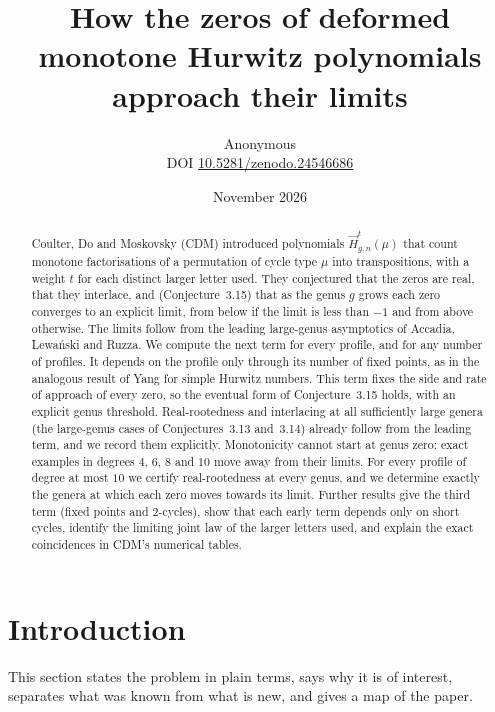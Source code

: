 \documentclass[11pt,a4paper]{article}
\title{How the zeros of deformed monotone Hurwitz polynomials approach their limits}
\author{Anonymous\\[3pt]{\small DOI \href{https://doi.org/10.5281/zenodo.24546686}{10.5281/zenodo.24546686}}}
\date{November 2026}
\theoremstyle{definition}\newtheorem{definition}[theorem]{Definition}
\theoremstyle{remark}\newtheorem{remark}[theorem]{Remark}\newtheorem{example}[theorem]{Example}
\numberwithin{equation}{section}
\begin{document}
\maketitle
\begin{abstract}
Coulter, Do and Moskovsky (CDM) introduced polynomials $\vec H^t_{g,n}(\mu)$ that count monotone factorisations of a permutation of cycle type $\mu$ into transpositions, with a weight $t$ for each distinct larger letter used. They conjectured that the zeros are real, that they interlace, and (Conjecture~3.15) that as the genus $g$ grows each zero converges to an explicit limit, from below if the limit is less than $-1$ and from above otherwise. The limits follow from the leading large-genus asymptotics of Accadia, Lewa\'nski and Ruzza. We compute the next term for every profile, and for any number of profiles. It depends on the profile only through its number of fixed points, as in the analogous result of Yang for simple Hurwitz numbers. This term fixes the side and rate of approach of every zero, so the eventual form of Conjecture~3.15 holds, with an explicit genus threshold. Real-rootedness and interlacing at all sufficiently large genera (the large-genus cases of Conjectures~3.13 and~3.14) already follow from the leading term, and we record them explicitly. Monotonicity cannot start at genus zero: exact examples in degrees $4$, $6$, $8$ and $10$ move away from their limits. For every profile of degree at most $10$ we certify real-rootedness at every genus, and we determine exactly the genera at which each zero moves towards its limit. Further results give the third term (fixed points and $2$-cycles), show that each early term depends only on short cycles, identify the limiting joint law of the larger letters used, and explain the exact coincidences in CDM's numerical tables.
\end{abstract}

\tableofcontents

\section{Introduction}\label{sec:intro}
This section states the problem in plain terms, says why it is of interest, separates what was known from what is new, and gives a map of the paper.
\end{document}
